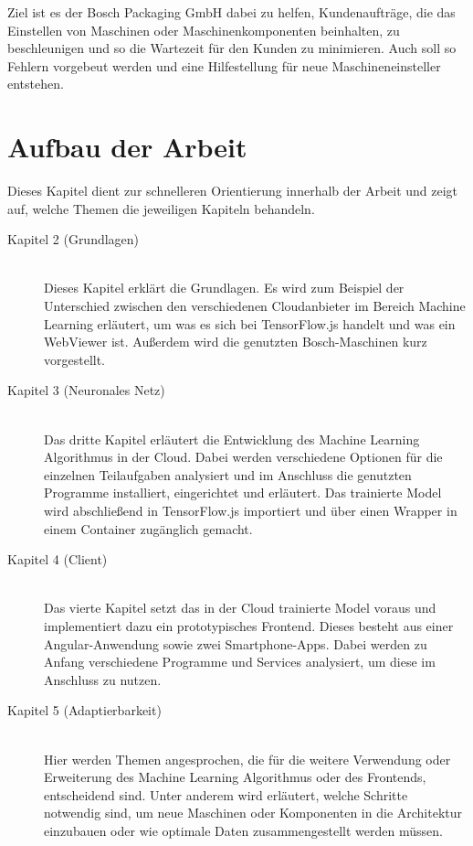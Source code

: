 Ziel ist es der Bosch Packaging GmbH dabei zu helfen, Kundenaufträge, die das Einstellen von Maschinen oder
Maschinenkomponenten beinhalten, zu beschleunigen und so die Wartezeit für den Kunden zu minimieren. Auch soll so
Fehlern vorgebeut werden und eine Hilfestellung für neue Maschineneinsteller entstehen.

\newpage

\section{Aufbau der Arbeit}
\label{sec:aufbauDerArbeit}
Dieses Kapitel dient zur schnelleren Orientierung innerhalb der Arbeit und zeigt auf, welche Themen die jeweiligen
Kapiteln behandeln.

\begin{description}

    \item[Kapitel 2 (Grundlagen)]\hfill \\
    Dieses Kapitel erklärt die Grundlagen. Es wird zum Beispiel der Unterschied zwischen den verschiedenen Cloudanbieter
    im Bereich Machine Learning erläutert, um was es sich bei TensorFlow.js handelt und was ein WebViewer ist. Außerdem
    wird die genutzten Bosch-Maschinen kurz vorgestellt.

    \item[Kapitel 3 (Neuronales Netz)]\hfill \\
    Das dritte Kapitel erläutert die Entwicklung des Machine Learning Algorithmus in der Cloud. Dabei werden verschiedene
    Optionen für die einzelnen Teilaufgaben analysiert und im Anschluss die genutzten Programme installiert, eingerichtet
    und erläutert. Das trainierte Model wird abschließend in TensorFlow.js importiert und über einen Wrapper in einem
    Container zugänglich gemacht.

    \item[Kapitel 4 (Client)]\hfill \\
    Das vierte Kapitel setzt das in der Cloud trainierte Model voraus und implementiert dazu ein prototypisches Frontend.
    Dieses besteht aus einer Angular-Anwendung sowie zwei Smartphone-Apps. Dabei werden zu Anfang verschiedene Programme
    und Services analysiert, um diese im Anschluss zu nutzen.

    \item[Kapitel 5 (Adaptierbarkeit)]\hfill \\
    Hier werden Themen angesprochen, die für die weitere Verwendung oder Erweiterung des Machine Learning Algorithmus
    oder des Frontends, entscheidend sind. Unter anderem wird erläutert, welche Schritte notwendig sind, um neue Maschinen
    oder Komponenten in die Architektur einzubauen oder wie optimale Daten zusammengestellt werden müssen.


\end{description}
